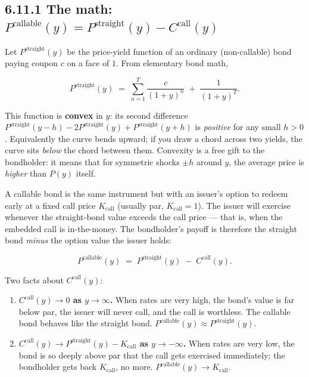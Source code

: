 \documentclass[
  10pt,
  twoside]{book}
\providecommand{\tightlist}{%
  \setlength{\itemsep}{0pt}\setlength{\parskip}{0pt}}
\begin{document}
\subsection{\texorpdfstring{6.11.1 The math:
\(P^{\text{callable}}(y) = P^{\text{straight}}(y) - C^{\text{call}}(y)\)}{6.11.1 The math: P\^{}\{\textbackslash text\{callable\}\}(y) = P\^{}\{\textbackslash text\{straight\}\}(y) - C\^{}\{\textbackslash text\{call\}\}(y)}}\label{the-math-ptextcallabley-ptextstraighty---ctextcally}

Let \(P^{\text{straight}}(y)\) be the price-yield function of an
ordinary (non-callable) bond paying coupon \(c\) on a face of \(1\).
From elementary bond math,

\[P^{\text{straight}}(y) \;=\; \sum_{n=1}^{T} \frac{c}{(1 + y)^n} \;+\; \frac{1}{(1 + y)^T}.\]

This function is \textbf{convex} in \(y\): its second difference
\(P^{\text{straight}}(y - h) - 2 P^{\text{straight}}(y) + P^{\text{straight}}(y + h)\)
is \emph{positive} for any small \(h > 0\). Equivalently the curve bends
upward; if you draw a chord across two yields, the curve sits
\emph{below} the chord between them. Convexity is a free gift to the
bondholder: it means that for symmetric shocks \(\pm h\) around \(y\),
the average price is \emph{higher} than \(P(y)\) itself.

A callable bond is the same instrument but with an issuer's option to
redeem early at a fixed call price \(K_{\text{call}}\) (usually par,
\(K_{\text{call}} = 1\)). The issuer will exercise whenever the
straight-bond value exceeds the call price --- that is, when the
embedded call is in-the-money. The bondholder's payoff is therefore the
straight bond \emph{minus} the option value the issuer holds:

\[P^{\text{callable}}(y) \;=\; P^{\text{straight}}(y) \;-\; C^{\text{call}}(y).\]

Two facts about \(C^{\text{call}}(y)\):

\begin{enumerate}
\def\labelenumi{\arabic{enumi}.}
\tightlist
\item
  \textbf{\(C^{\text{call}}(y) \to 0\) as \(y \to \infty\).} When rates
  are very high, the bond's value is far below par, the issuer will
  never call, and the call is worthless. The callable bond behaves like
  the straight bond.
  \(P^{\text{callable}}(y) \approx P^{\text{straight}}(y)\).
\item
  \textbf{\(C^{\text{call}}(y) \to P^{\text{straight}}(y) - K_{\text{call}}\)
  as \(y \to -\infty\).} When rates are very low, the bond is so deeply
  above par that the call gets exercised immediately; the bondholder
  gets back \(K_{\text{call}}\), no more.
  \(P^{\text{callable}}(y) \to K_{\text{call}}\).
\end{enumerate}
\end{document}
